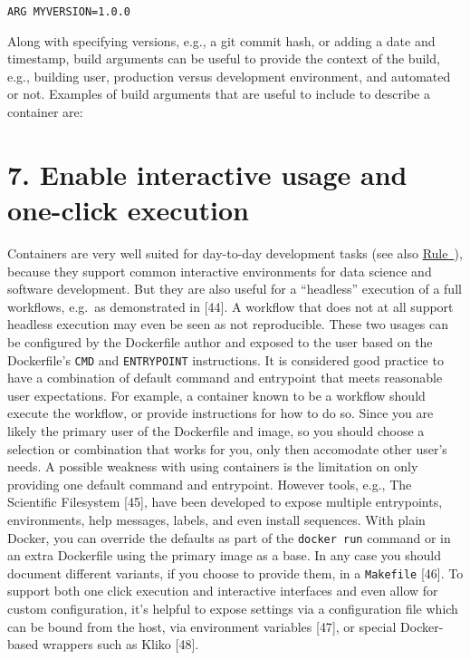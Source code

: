 \documentclass[10pt,letterpaper]{article}
\begin{document}
\begin{verbatim}
ARG MYVERSION=1.0.0
\end{verbatim}

Along with specifying versions, e.g., a git commit hash, or adding a
date and timestamp, build arguments can be useful to provide the context
of the build, e.g., building user, production versus development
environment, and automated or not. Examples of build arguments that are
useful to include to describe a container are:

\hypertarget{enable-interactive-usage-and-one-click-execution}{%
\section*{7. Enable interactive usage and one-click
execution}\label{enable-interactive-usage-and-one-click-execution}}

  \label{rule:interactive} 

Containers are very well suited for day-to-day development tasks (see
also \hyperref[{rule:usage}]{Rule~}), because they
support common interactive environments for data science and software
development. But they are also useful for a ``headless'' execution of a
full workflows, e.g.~as demonstrated in {[}44{]}. A workflow that does
not at all support headless execution may even be seen as not
reproducible. These two usages can be configured by the Dockerfile
author and exposed to the user based on the Dockerfile's \texttt{CMD}
and \texttt{ENTRYPOINT} instructions. It is considered good practice to
have a combination of default command and entrypoint that meets
reasonable user expectations. For example, a container known to be a
workflow should execute the workflow, or provide instructions for how to
do so. Since you are likely the primary user of the Dockerfile and
image, so you should choose a selection or combination that works for
you, only then accomodate other user's needs. A possible weakness with
using containers is the limitation on only providing one default command
and entrypoint. However tools, e.g., The Scientific Filesystem {[}45{]},
have been developed to expose multiple entrypoints, environments, help
messages, labels, and even install sequences. With plain Docker, you can
override the defaults as part of the \texttt{docker\ run} command or in
an extra Dockerfile using the primary image as a base. In any case you
should document different variants, if you choose to provide them, in a
\texttt{Makefile} {[}46{]}. To support both one click execution and
interactive interfaces and even allow for custom configuration, it's
helpful to expose settings via a configuration file which can be bound
from the host, via environment variables {[}47{]}, or special
Docker-based wrappers such as Kliko {[}48{]}.
\end{document}
